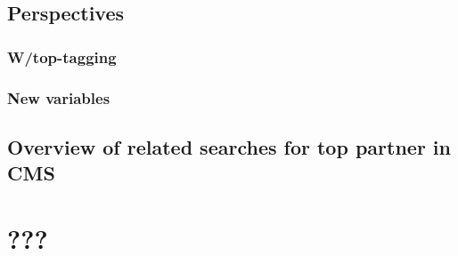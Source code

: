     \section{Perspectives \label{sec:analysis_perspective}}
        \loremipsum
        \subsection{W/top-tagging}
        \loremipsum
        \subsection{New variables}
        \loremipsum
    
    \section{Overview of related searches for top partner in CMS \label{sec:analysis_overviewStopSearches}}
        \loremipsum

















\chapter{???}
        \loremipsum



        \loremipsum




